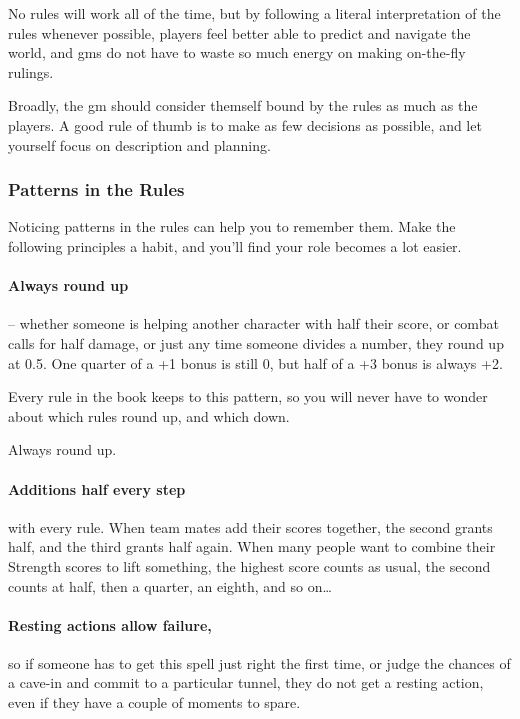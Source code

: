 \begin{multicols}{2}
No rules will work all of the time, but by following a literal interpretation of the rules whenever possible, players feel better able to predict and navigate the world, and \glspl{gm} do not have to waste so much energy on making on-the-fly rulings.

Broadly, the \gls{gm} should consider themself bound by the rules as much as the players.
A good rule of thumb is to make as few decisions as possible, and let yourself focus on description and planning.

\subsubsection{Patterns in the Rules}

Noticing patterns in the rules can help you to remember them.
Make the following principles a habit, and you'll find your role becomes a lot easier.

\paragraph{Always round up} -- whether someone is helping another character with half their score, or combat calls for half damage, or just any time someone divides a number, they round up at 0.5.
One quarter of a +1 bonus is still 0, but half of a +3 bonus is always +2.

Every rule in the book keeps to this pattern, so you will never have to wonder about which rules round up, and which down.

Always round up.

\paragraph{Additions half every step} with every rule.
When team mates add their scores together, the second grants half, and the third grants half again.
When many people want to combine their Strength scores to lift something, the highest score counts as usual, the second counts at half, then a quarter, an eighth, and so on\ldots

\paragraph{Resting actions allow failure,}
so if someone has to get this spell just right the first time, or judge the chances of a cave-in and commit to a particular tunnel, they do not get a resting action, even if they have a couple of moments to spare.


\end{multicols}

